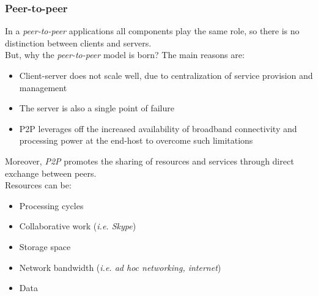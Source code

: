     \subsubsection{Peer-to-peer}
    In a \textit{peer-to-peer} applications all components play the same role, so there is no 
    distinction between clients and servers.\\
    But, why the \textit{peer-to-peer} model is born? The main reasons are:
    \begin{itemize}
        \item Client-server does not scale well, due to centralization of service provision and management
        \item The server is also a single point of failure
        \item P2P leverages off the increased availability of broadband connectivity and processing
            power at the end-host to overcome such limitations
    \end{itemize}
    Moreover, \textit{P2P} promotes the sharing of resources and services through direct exchange between peers.\\
    Resources can be:
    \begin{itemize}
        \item Processing cycles
        \item Collaborative work (\textit{i.e. Skype})
        \item Storage space
        \item Network bandwidth (\textit{i.e. ad hoc networking, internet})
        \item Data
    \end{itemize}

